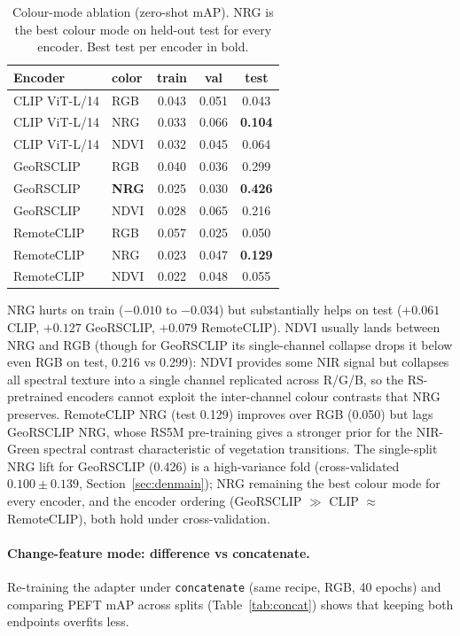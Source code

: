 \documentclass{article}
\begin{document}
\begin{table}[H]
    \centering
    \caption{Colour-mode ablation (zero-shot mAP). NRG is the best colour mode on
    held-out test for every encoder. Best test per encoder in bold.}
    \label{tab:nir}
    \begin{tabular}{llccc}
        \toprule
        \textbf{Encoder} & \textbf{color} & \textbf{train} & \textbf{val} & \textbf{test} \\
        \midrule
        CLIP ViT-L/14 & RGB  & 0.043 & 0.051 & 0.043 \\
        CLIP ViT-L/14 & NRG  & 0.033 & 0.066 & \textbf{0.104} \\
        CLIP ViT-L/14 & NDVI & 0.032 & 0.045 & 0.064 \\
        GeoRSCLIP     & RGB  & 0.040 & 0.036 & 0.299 \\
        GeoRSCLIP     & \textbf{NRG}  & 0.025 & 0.030 & \textbf{0.426} \\
        GeoRSCLIP     & NDVI & 0.028 & 0.065 & 0.216 \\
        RemoteCLIP    & RGB  & 0.057 & 0.025 & 0.050 \\
        RemoteCLIP    & NRG  & 0.023 & 0.047 & \textbf{0.129} \\
        RemoteCLIP    & NDVI & 0.022 & 0.048 & 0.055 \\
        \bottomrule
    \end{tabular}
\end{table}

NRG hurts on train ($-0.010$ to $-0.034$) but substantially helps on test
($+0.061$ CLIP, $+0.127$ GeoRSCLIP, $+0.079$ RemoteCLIP). NDVI usually lands
between NRG and RGB (though for GeoRSCLIP its single-channel collapse drops it
below even RGB on test, 0.216 vs 0.299): NDVI provides some NIR signal but
collapses all spectral texture into a single channel replicated across R/G/B, so
the RS-pretrained encoders cannot exploit the inter-channel colour contrasts that
NRG preserves. RemoteCLIP NRG (test 0.129) improves over RGB (0.050) but lags
GeoRSCLIP NRG, whose RS5M pre-training gives a stronger prior for the NIR-Green
spectral contrast characteristic of vegetation transitions. The single-split NRG
lift for GeoRSCLIP (0.426) is a high-variance fold (cross-validated
$0.100 \pm 0.139$, Section~\ref{sec:denmain}); NRG remaining the best colour mode
for every encoder, and the encoder ordering (GeoRSCLIP $\gg$ CLIP $\approx$
RemoteCLIP), both hold under cross-validation.


\paragraph{Change-feature mode: difference vs concatenate.}
\label{sec:concat}
Re-training the adapter under \texttt{concatenate} (same recipe, RGB, 40 epochs)
and comparing PEFT mAP across splits (Table~\ref{tab:concat}) shows that keeping
both endpoints overfits less.
\end{document}
